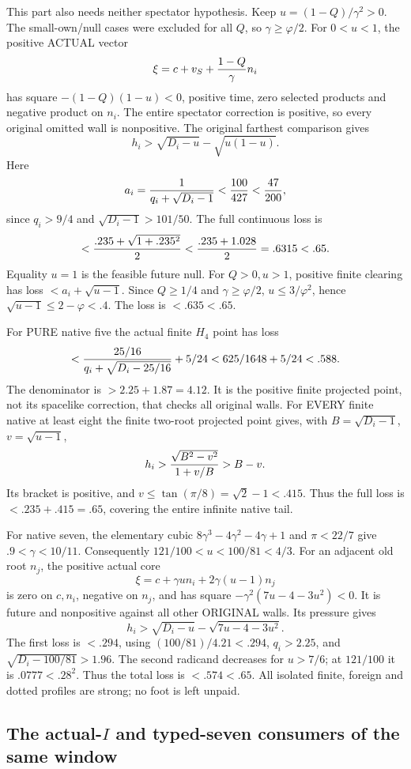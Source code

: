 This part also needs neither spectator
hypothesis.  Keep
\(u=(1-Q)/\gamma^2>0\).
The small-own/null cases were excluded for
all \(Q\), so \(\gamma\ge\varphi/2\).
For \(0<u<1\), the positive ACTUAL vector
\[
        \xi=c+v_S+{1-Q\over\gamma}n_i
\]
has square \(-(1-Q)(1-u)<0\), positive
time, zero selected products and negative
product on \(n_i\).
The entire spectator correction is positive,
so every original omitted wall is nonpositive.
The original farthest comparison gives
\[
 h_i>\sqrt{D_i-u}-\sqrt{u(1-u)} .
\]
Here
\[
 a_i={1\over q_i+\sqrt{D_i-1}}<{100\over427}<{47\over200},
\]
since \(q_i>9/4\) and
\(\sqrt{D_i-1}>101/50\).
The full continuous loss is
\[
 <{.235+\sqrt{1+.235^2}\over2}
 <{.235+1.028\over2}=.6315<.65 .
\]
Equality \(u=1\) is the feasible future null.
For \(Q>0,u>1\), positive finite clearing
has loss \(<a_i+\sqrt{u-1}\).
Since \(Q\ge1/4\) and \(\gamma\ge\varphi/2\),
\(u\le3/\varphi^2\), hence
\(\sqrt{u-1}\le2-\varphi<.4\).
The loss is \(<.635<.65\).

For PURE native five the actual finite
\(H_4\) point has loss
\[
 <{25/16\over q_i+\sqrt{D_i-25/16}}+5/24
              <625/1648+5/24<.588 .
\]
The denominator is \(>2.25+1.87=4.12\).
It is the positive finite projected point,
not its spacelike correction, that checks
all original walls.
For EVERY finite native at least eight
the finite two-root projected point gives,
with \(B=\sqrt{D_i-1}\), \(v=\sqrt{u-1}\),
\[
 h_i>{\sqrt{B^2-v^2}\over1+v/B}>B-v .
\]
Its bracket is positive, and
\(v\le\tan(\pi/8)=\sqrt2-1<.415\).
Thus the full loss is \(<.235+.415=.65\),
covering the entire infinite native tail.

For native seven, the elementary cubic
\(8\gamma^3-4\gamma^2-4\gamma+1\) and
\(\pi<22/7\) give \(.9<\gamma<10/11\).
Consequently \(121/100<u<100/81<4/3\).
For an adjacent old root \(n_j\), the
positive actual core
\[
             \xi=c+\gamma un_i+2\gamma(u-1)n_j
\]
is zero on \(c,n_i\), negative on \(n_j\),
and has square
\(-\gamma^2(7u-4-3u^2)<0\).
It is future and nonpositive against all
other ORIGINAL walls.
Its pressure gives
\[
 h_i>\sqrt{D_i-u}-\sqrt{7u-4-3u^2}.
\]
The first loss is \(<.294\), using
\((100/81)/4.21<.294\),
\(q_i>2.25\), and
\(\sqrt{D_i-100/81}>1.96\).
The second radicand decreases for \(u>7/6\);
at \(121/100\) it is \(.0777<.28^2\).
Thus the total loss is \(<.574<.65\).
All isolated finite, foreign and dotted
profiles are strong; no foot is left unpaid.

\subsection{The actual-\(I\) and typed-seven consumers of the same window}
\label{app:arithA10consumers}

